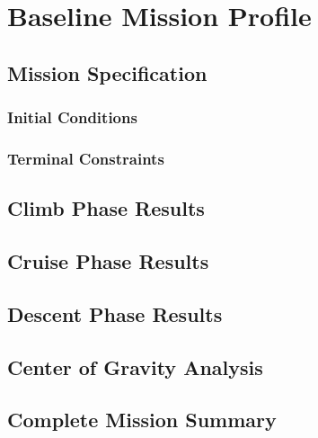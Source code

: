 \documentclass[12pt, a4paper]{report}
\begin{document}
\section{Baseline Mission Profile}


\subsection{Mission Specification}


\subsubsection{Initial Conditions}


\subsubsection{Terminal Constraints}




\subsection{Climb Phase Results}

 
\subsection{Cruise Phase Results}

 
\subsection{Descent Phase Results}

\subsection{Center of Gravity Analysis}


\subsection{Complete Mission Summary}

\end{document}
